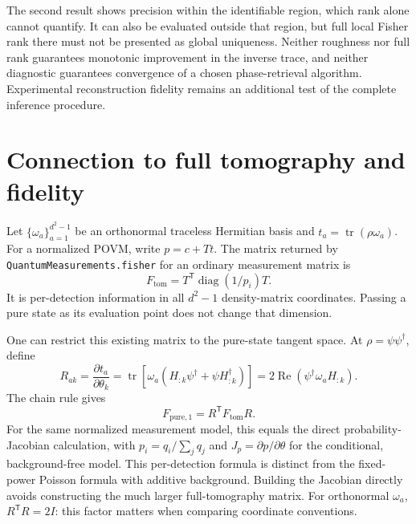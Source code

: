 \documentclass[11pt,a4paper]{article}
\newcommand{\tr}{\operatorname{tr}}
\newcommand{\diag}{\operatorname{diag}}
\newcommand{\RePart}{\operatorname{Re}}
\begin{document}
The second result shows precision within the identifiable region, which
rank alone cannot quantify. It can also be evaluated outside that region,
but full local Fisher rank there must not be presented as global uniqueness.
Neither roughness nor full rank guarantees monotonic improvement in the
inverse trace, and neither diagnostic guarantees convergence of a chosen
phase-retrieval algorithm. Experimental reconstruction fidelity remains
an additional test of the complete inference procedure.

\section{Connection to full tomography and fidelity}
Let $\{\omega_a\}_{a=1}^{d^2-1}$ be an orthonormal traceless Hermitian basis
and $t_a=\tr(\rho\omega_a)$. For a normalized POVM, write
$p=c+Tt$. The matrix returned by \texttt{QuantumMeasurements.fisher} for
an ordinary measurement matrix is
\begin{equation}
 F_{\mathrm{tom}}=T^{\mathsf T}\diag(1/p_i)T.
\end{equation}
It is per-detection information in all $d^2-1$ density-matrix coordinates.
Passing a pure state as its evaluation point does not change that dimension.

One can restrict this existing matrix to the pure-state tangent space.
At $\rho=\psi\psi^\dagger$, define
\begin{equation}
 R_{ak}=\frac{\partial t_a}{\partial\theta_k}
 =\tr\!\left[\omega_a(H_{:k}\psi^\dagger+\psi H_{:k}^\dagger)\right]
 =2\RePart(\psi^\dagger\omega_aH_{:k}).
\end{equation}
The chain rule gives
\begin{equation}
 F_{\mathrm{pure},1}=R^{\mathsf T}F_{\mathrm{tom}}R.
\end{equation}
For the same normalized measurement model, this equals the direct
probability-Jacobian calculation, with $p_i=q_i/\sum_jq_j$ and
$J_p=\partial p/\partial\theta$ for the conditional, background-free
model. This per-detection formula is distinct from the fixed-power Poisson
formula with additive background. Building the Jacobian directly avoids constructing
the much larger full-tomography matrix. For orthonormal $\omega_a$,
$R^{\mathsf T}R=2I$: this factor matters when comparing coordinate conventions.
\end{document}
